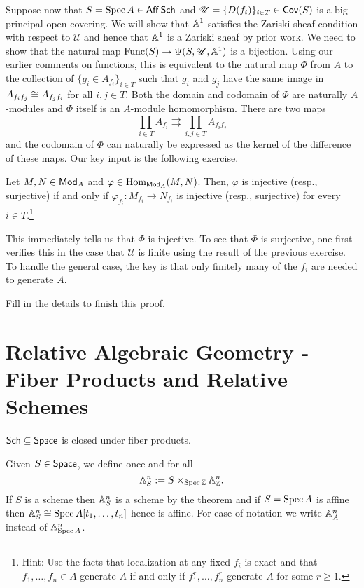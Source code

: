 \documentclass[11pt]{article}
\renewcommand{\phi}{\varphi}
\newcommand{\U}{\mathscr{U}}
\begin{document}
Suppose now that $S=\operatorname{Spec} A\in\operatorname{\mathsf{Aff}}\operatorname{\mathsf{Sch}}$ and $\U=\{D(f_i)\}_{i\in T}\in\Cov(S)$ is a big principal open covering. We will show that $\mathbb{A}^1$ satisfies the Zariski sheaf condition with respect to $\U$ and hence that $\mathbb{A}^1$ is a Zariski sheaf by prior work. We need to show that the natural map $\Func(S)\to\Psi(S,\U,\A^1)$ is a bijection. Using our earlier comments on functions, this is equivalent to the natural map $\Phi$ from $A$ to the collection of $\{g_i\in A_{f_i}\}_{i\in T}$ such that $g_i$ and $g_j$ have the same image in $A_{f_if_j}\cong A_{f_jf_i}$ for all $i,j\in T$. Both the domain and codomain of $\Phi$ are naturally $A$-modules and $\Phi$ itself is an $A$-module homomorphism. There are two maps
$$\prod_{i\in T}A_{f_i}\rightrightarrows\prod_{i,j\in T}A_{f_if_j}$$
and the codomain of $\Phi$ can naturally be expressed as the kernel of the difference of these maps. Our key input is the following exercise.

\begin{exercise}
Let $M,N\in\operatorname{\mathsf{Mod}}_A$ and $\phi\in\Hom_{\Mod_A}(M,N)$. Then, $\phi$ is injective (resp., surjective) if and only if $\phi_{f_i}: M_{f_i}\to N_{f_i}$ is injective (resp., surjective) for every $i\in T$.\footnote{Hint: Use the facts that localization at any fixed $f_i$ is exact and that $f_1,\ldots,f_n\in A$ generate $A$ if and only if $f_1^r,\ldots,f_n^r$ generate $A$ for some $r\geq1$.}
\end{exercise}

This immediately tells us that $\Phi$ is injective. To see that $\Phi$ is surjective, one first verifies this in the case that $\U$ is finite using the result of the previous exercise. To handle the general case, the key is that only finitely many of the $f_i$ are needed to generate $A$.

\begin{exercise}
Fill in the details to finish this proof.
\end{exercise}

\section{Relative Algebraic Geometry - Fiber Products and Relative Schemes}
\begin{theorem}
$\operatorname{\mathsf{Sch}}\subseteq\operatorname{\mathsf{Space}}$ is closed under fiber products.
\end{theorem}

Given $S\in\operatorname{\mathsf{Space}}$, we define once and for all
$$\mathbb{A}_S^n:=S\times_{\operatorname{Spec}\mathbb{Z}}\mathbb{A}_{\mathbb{Z}}^n.$$
If $S$ is a scheme then $\mathbb{A}_S^n$ is a scheme by the theorem and if $S=\operatorname{Spec} A$ is affine then $\mathbb{A}_S^n\cong\operatorname{Spec} A[t_1,\ldots,t_n]$ hence is affine. For ease of notation we write $\mathbb{A}_A^n$ instead of $\mathbb{A}_{\operatorname{Spec} A}^n$.
\end{document}
